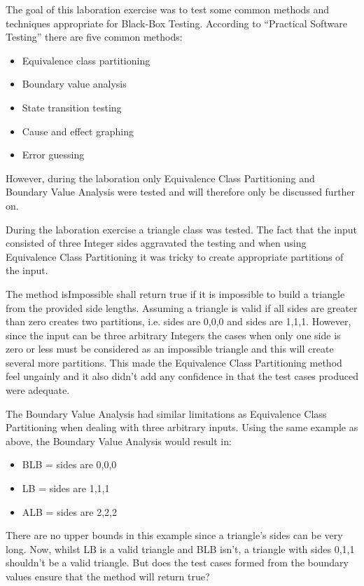 The goal of this laboration exercise was to test some common methods and techniques appropriate for Black-Box Testing.
According to ``Practical Software Testing'' there are five common methods:
\begin{itemize}
	\item Equivalence class partitioning
	\item Boundary value analysis
	\item State transition testing
	\item Cause and effect graphing
	\item Error guessing
\end{itemize}

\noindent However, during the laboration only Equivalence Class Partitioning and Boundary Value Analysis were tested and will therefore only be discussed further on.

During the laboration exercise a triangle class was tested. The fact that the input consisted of three Integer sides aggravated the testing and when using Equivalence Class Partitioning it was tricky to create appropriate partitions of the input.

The method isImpossible shall return true if it is impossible to build a triangle from the provided side lengths. Assuming a triangle is valid if all sides are greater than zero creates two partitions, i.e. sides are 0,0,0 and sides are 1,1,1. However, since the input can be three arbitrary Integers the cases when only one side is zero or less must be considered as an impossible triangle and this will create several more partitions. This made the Equivalence Class Partitioning method feel ungainly and it also didn't add any confidence in that the test cases produced were adequate.

The Boundary Value Analysis had similar limitations as Equivalence Class Partitioning when dealing with three arbitrary inputs. 
Using the same example as above, the Boundary Value Analysis would result in:
\begin{itemize}
	\item BLB = sides are 0,0,0
	\item LB = sides are 1,1,1
	\item ALB = sides are 2,2,2
\end{itemize}
There are no upper bounds in this example since a triangle's sides can be very long. 
Now, whilst LB is a valid triangle and BLB isn't, a triangle with sides 0,1,1 shouldn't be a valid triangle. But does the test cases formed from the boundary values ensure that the method will return true?

